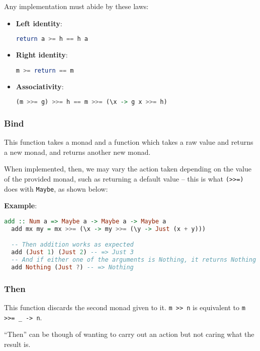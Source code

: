 Any implementation must abide by these laws:
\begin{itemize}
  \item \textbf{Left identity}: \begin{lstlisting}[language=haskell]
return a >= h == h a\end{lstlisting}
  \item \textbf{Right identity}: \begin{lstlisting}[language=haskell]
m >= return == m\end{lstlisting}
  \item \textbf{Associativity}: \begin{lstlisting}[language=haskell]
(m >>= g) >>= h == m >>= (\x -> g x >>= h)\end{lstlisting}
\end{itemize}

\subsubsection{Bind}
This function takes a monad and a function which takes a raw value and returns a new monad, and returns another new monad.

When implemented, then, we may vary the action taken depending on the value of the provided monad, such as returning a default value -- this is what \texttt{(>>=)} does with \texttt{Maybe}, as shown below: 

\textbf{Example}:
\begin{lstlisting}[language=haskell]
  add :: Num a => Maybe a -> Maybe a -> Maybe a
  add mx my = mx >>= (\x -> my >>= (\y -> Just (x + y)))

  -- Then addition works as expected
  add (Just 1) (Just 2) -- => Just 3
  -- And if either one of the arguments is Nothing, it returns Nothing
  add Nothing (Just ?) -- => Nothing
\end{lstlisting}

\subsubsection{Then}

This function discards the second monad given to it. \texttt{m >> n} is equivalent to \texttt{m >>= \_ -> n}.

``Then'' can be though of wanting to carry out an action but not caring what the result is.

